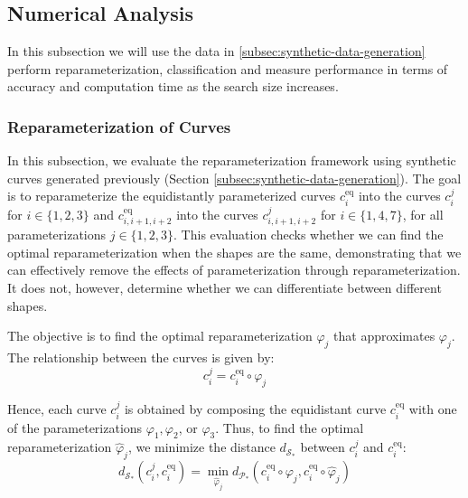 \subsection{Numerical Analysis}
\label{sec:numerical-reparameterization}

In this subsection we will use the data in \ref{subsec:synthetic-data-generation} perform reparameterization, classification and measure performance in terms of accuracy and computation time as the search size increases.

\FloatBarrier
\subsubsection{Reparameterization of Curves}
\label{subsec:reparameterization-curves}

In this subsection, we evaluate the reparameterization framework using synthetic curves generated previously (Section \ref{subsec:synthetic-data-generation}). The goal is to reparameterize the equidistantly parameterized curves \(c_i^\text{eq}\) into the curves \(c_i^j\) for \(i \in \{1, 2, 3\}\) and \(c_{i,i+1,i+2}^\text{eq}\) into the curves \(c_{i,i+1,i+2}^j\) for \(i \in \{1, 4, 7\}\), for all parameterizations \(j \in \{1, 2, 3\}\). This evaluation checks whether we can find the optimal reparameterization when the shapes are the same, demonstrating that we can effectively remove the effects of parameterization through reparameterization. It does not, however, determine whether we can differentiate between different shapes.

The objective is to find the optimal reparameterization \(\hat{\varphi}_j\) that approximates \(\varphi_j\). The relationship between the curves is given by:
\begin{equation}
    c_i^j = c_i^\text{eq} \circ \varphi_j
\end{equation}

Hence, each curve \(c_i^j\) is obtained by composing the equidistant curve \(c_i^\text{eq}\) with one of the parameterizations \(\varphi_1, \varphi_2\), or \(\varphi_3\). Thus, to find the optimal reparameterization \(\hat{\varphi}_j\), we minimize the distance \(d_{\mathcal{S}_*}\) between \(c_i^j\) and \(c_i^{\text{eq}}\):
\begin{equation}
    d_{\mathcal{S}_*}(c_i^j, c_i^{\text{eq}}) = \min_{\hat{\varphi}_j} d_{\mathcal{P}_*}(c_i^{\text{eq}} \circ \varphi_j, c_i^{\text{eq}} \circ \hat{\varphi}_j)
\end{equation}


